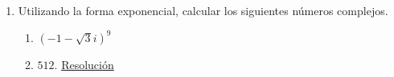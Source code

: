 \documentclass[a4paper]{article}
\newcommand{\answer}{\item[**]}
\newcommand{\exercise}{\item}
\newcommand{\df}[2]{\displaystyle\frac{#1}{#2}}
\newcommand{\cis}[1]{\left[\cos\left({#1}\right)+i\sin\left({#1}\right)\right]}
\begin{document}
\begin{enumerate}
\begin{multicols}{3}
\begin{enumerate} [label=(\alph*)]
		\item $-7$
		\answer $-7+0i=7\cis{\pi}=7e^{\pi i}$

		\item $\sqrt{6}\cis{\pi}$
		\answer $\sqrt{6}\cis{\pi}=\sqrt{6}e^{\pi i}=-\sqrt{6}+0i$

		\item $3e^{\frac{\pi}{4}i}$
		\answer $3e^{\frac{\pi}{4}i}=3\cis{\df{\pi}{4}}=\df{3\sqrt{2}}{2}+\df{3\sqrt{2}}{2}i$

		\item $4i$
		\answer $4i=4\cis{\df{\pi}{2}}=4e^{\df{\pi}{2}i}$

		\item $2\cis{\df{\pi}{4}}$
		\answer $2\cis{\df{\pi}{4}}=2e^{\frac{\pi}{4}i}=\sqrt{2}+\sqrt{2}i$

		\item $e^{\frac{\pi}{2}i}$
		\answer $e^{\frac{\pi}{2}i}=\cos\left(\df{\pi}{2}\right)+i\sin\left(\df{\pi}{2}\right)=0+i$

		\item $-2\sqrt{3}+2i$
		\answer $-2\sqrt{3}+2i=4\cis{\df{5\pi}{6}}=4e^{\frac{5\pi}{6}i}$

		\item $4\cis{0}$
		\answer $4\cis{0}=4e^{0}=4+0i$

		\item $2e^{-\frac{\pi}{3}i}$
		\answer $2e^{-\frac{\pi}{3}i}=2\cis{-\df{\pi}{3}}=1-\sqrt{3}i$

		\item $-1-i$
		\answer $-1-i=\sqrt{2}\cis{\df{\pi}{4}}=\sqrt{2}e^{\frac{\pi}{4}i}$

		\item $1\cis{\df{\pi}{12}}$
		\answer $\cos\left(\df{\pi}{12}\right)+i\sin\left(\df{\pi}{12}\right)=e^{\frac{\pi}{12}} \simeq 0.9659 + 0.2588 i$

		\item $4e^{\frac{3\pi}{2}i}$
		\answer $4e^{\frac{3\pi}{2}i}=4\cis{\df{3\pi}{2}}=0-4i$

	\end{enumerate}
	\end{multicols}

	\exercise Utilizando la forma exponencial, calcular los siguientes números complejos.
	\begin{multicols}{2}
	\begin{enumerate} [label=(\alph*)]
		
		\item $(-1-\sqrt{3}i)^9$
		\answer $512$. \href{https://youtu.be/bi_tVZZeAtY}{Resolución}


\end{enumerate}
\end{multicols}
\end{enumerate}
\end{document}
